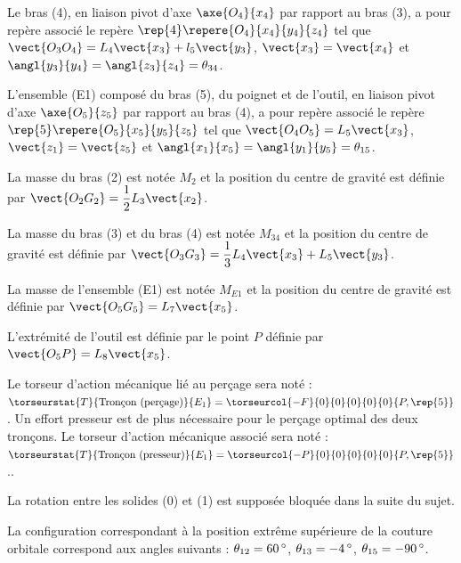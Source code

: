 Le bras (4), en liaison pivot d'axe $\axe{O_4}{x_4}$ par rapport au bras (3), a pour repère
associé le repère $\rep{4}\repere{O_4}{x_4}{y_4}{z_4}$ tel que $\vect{O_3 O_4} = L_4\vect{x_3} +l_5 \vect{y_3}$, $\vect{x_3}=\vect{x_4}$ et $\angl{y_3}{y_4}=\angl{z_3}{z_4}=\theta_{34}$.

L'ensemble (E1) composé du bras (5), du poignet et de l'outil, en liaison pivot d'axe $\axe{O_5}{z_5}$ par
rapport au bras (4), a pour repère associé le repère $\rep{5}\repere{O_5}{x_5}{y_5}{z_5}$ tel que $\vect{O_4O_5}=L_5\vect{x_3}$, $\vect{z_1}=\vect{z_5}$ et $\angl{x_1}{x_5}=\angl{y_1}{y_5}=\theta_{15}$.


La masse du bras (2) est notée $M_2$ et la position du centre de gravité est définie par $\vect{O_2G_2}=\dfrac{1}{2}L_3\vect{x_2}$.


La masse du bras (3) et du bras (4) est notée $M_{34}$ et la position du centre de gravité est définie par
$\vect{O_3G_3}=\dfrac{1}{3}L_4\vect{x_3}+L_5\vect{y_3}$.

La masse de l'ensemble (E1) est notée $M_{E1}$ et la position du centre de gravité est définie par
$\vect{O_5G_5}=L_7\vect{x_5}$. 

L’extrémité de l’outil est définie par le point $P$ définie par $\vect{O_5P}=L_8\vect{x_5}$. 

Le torseur d’action mécanique lié au perçage sera noté : $\torseurstat{T}{\text{Tronçon (perçage)}}{E_1}=\torseurcol{-F}{0}{0}{0}{0}{0}{P, \rep{5}}$.
Un effort presseur est de plus nécessaire pour le perçage optimal des deux tronçons. Le torseur
d’action mécanique associé sera noté :$\torseurstat{T}{\text{Tronçon (presseur)}}{E_1}=\torseurcol{-P}{0}{0}{0}{0}{0}{P, \rep{5}}$..

La rotation entre les solides (0) et (1) est supposée bloquée dans la suite du sujet.





La configuration correspondant à la position extrême supérieure de la couture orbitale correspond aux angles suivants : $\theta_{12}=\SI{60}{\ensuremath{^{\circ}}}$, $\theta_{13}=-\SI{4}{\ensuremath{^{\circ}}}$, $\theta_{15}=-\SI{90}{\ensuremath{^{\circ}}}$.

